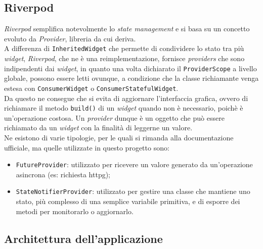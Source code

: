 \subsection{Riverpod}
\label{subsec:riverpod}

\emph{Riverpod} semplifica notevolmente lo \emph{state management} e si basa su un concetto evoluto da \emph{Provider}\cite{site:provider}, libreria da cui deriva.\\
A differenza di \lstinline{InheritedWidget}\cite{site:inheritw} che permette di condividere lo stato tra più \emph{widget}, \emph{Riverpod}, che ne è una reimplementazione, fornisce \emph{providers} che sono indipendenti dai \emph{widget}, in quanto una volta dichiarato il \lstinline{ProviderScope} a livello globale, possono essere letti ovunque, a condizione che la classe richiamante venga estesa con \lstinline{ConsumerWidget} o \lstinline{ConsumerStatefulWidget}\cite{site:reading-provider}. \\
Da questo ne consegue che si evita di aggiornare l'interfaccia grafica, ovvero di richiamare il metodo \lstinline{build()} di un \emph{widget} quando non è necessario, poichè è un'operazione costosa.
Un \emph{provider} dunque è un oggetto che può essere richiamato da un \emph{widget} con la finalità di leggerne un valore.\\
Ne esistono di varie tipologie, per le quali si rimanda alla documentazione ufficiale\cite{site:riverpod}, ma quelle utilizzate in questo progetto sono:
\begin{itemize}
    \item \lstinline{FutureProvider}: utilizzato per ricevere un valore generato da un'operazione asincrona (es: richiesta \gls{httpg}\glsoccur);
    \item \lstinline{StateNotifierProvider}: utilizzato per gestire una classe che mantiene uno stato, più complesso di una semplice variabile primitiva, e di esporre dei metodi per monitorarlo o aggiornarlo.
\end{itemize}

\subsection{Architettura dell'applicazione}
\label{subsec:architettura-app}

